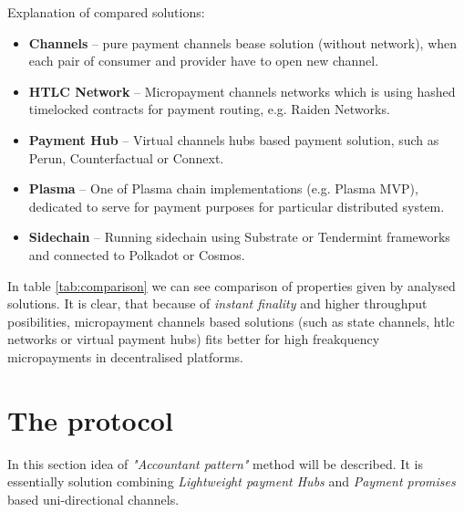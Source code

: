 \documentclass[a4paper,12pt]{article}
\begin{document}
Explanation of compared solutions:

\begin{itemize}
    \item \textbf{Channels} -- pure payment channels bease solution (without 
    network), when each pair of consumer and provider have to open new channel.
    \item \textbf{HTLC Network} -- Micropayment channels networks which is using
    hashed timelocked contracts for payment routing, e.g. Raiden Networks.
    \item \textbf{Payment Hub} -- Virtual channels hubs based payment solution,
    such as Perun, Counterfactual or Connext.
    \item \textbf{Plasma} -- One of Plasma chain implementations (e.g. Plasma 
    MVP), dedicated to serve for payment purposes for particular distributed
    system.
    \item \textbf{Sidechain} -- Running sidechain using Substrate or Tendermint
    frameworks and connected to Polkadot or Cosmos.
\end{itemize}

In table \ref{tab:comparison} we can see comparison of properties given by 
analysed solutions. It is clear, that because of \textit{instant finality} and 
higher throughput posibilities, micropayment channels based solutions (such as
state channels, htlc networks or virtual payment hubs) fits better for high 
freakquency micropayments in decentralised platforms.

\section{The protocol}

In this section idea of \textit{"Accountant pattern"} method will be described. 
It is essentially solution combining \textit{Lightweight payment Hubs} and 
\textit{Payment promises} based uni-directional channels.


\newpage
\printbibliography[heading=bibintoc]
\end{document}

